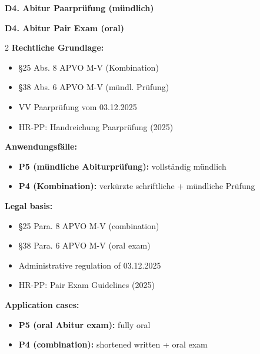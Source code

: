 \documentclass[10pt,a4paper]{article}
\newcommand{\secbil}[2]{%
\vspace{6pt}
\noindent\colorbox{spaet}{\parbox{0.48\textwidth}{\color{white}\bfseries\small #1}}%
\hfill%
\colorbox{english}{\parbox{0.48\textwidth}{\color{white}\bfseries\small #2}}
\vspace{3pt}
}
\begin{document}
\vspace{3mm}

\secbil{D4. Abitur Paarprüfung (mündlich)}{D4. Abitur Pair Exam (oral)}

\vspace{2mm}

\begin{paracol}{2}
\small
\textbf{Rechtliche Grundlage:}\footnotemark[13]
\begin{itemize}[noitemsep,topsep=2pt]
\item §25 Abs. 8 APVO M-V (Kombination)
\item §38 Abs. 6 APVO M-V (mündl. Prüfung)
\item VV Paarprüfung vom 03.12.2025
\item HR-PP: Handreichung Paarprüfung (2025)
\end{itemize}

\textbf{Anwendungsfälle:}
\begin{itemize}[noitemsep,topsep=2pt]
\item \textbf{P5 (mündliche Abiturprüfung):} vollständig mündlich
\item \textbf{P4 (Kombination):} verkürzte schriftliche + mündliche Prüfung
\end{itemize}

\switchcolumn

\small\color{english}
\textbf{Legal basis:}\footnotemark[13]
\begin{itemize}[noitemsep,topsep=2pt]
\item §25 Para. 8 APVO M-V (combination)
\item §38 Para. 6 APVO M-V (oral exam)
\item Administrative regulation of 03.12.2025
\item HR-PP: Pair Exam Guidelines (2025)
\end{itemize}

\textbf{Application cases:}
\begin{itemize}[noitemsep,topsep=2pt]
\item \textbf{P5 (oral Abitur exam):} fully oral
\item \textbf{P4 (combination):} shortened written + oral exam
\end{itemize}

\end{paracol}

\vspace{2mm}
\end{document}

